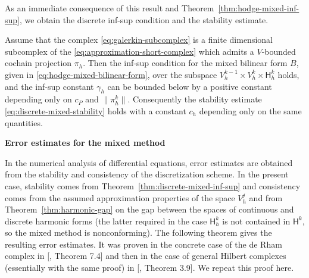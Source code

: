 {As an immediate consequence of this result and Theorem~\ref{thm:hodge-mixed-inf-sup}, we obtain the discrete inf-sup condition and the stability estimate.}

\begin{Theorem}\label{thm:discrete-mixed-inf-sup}
{Assume that the complex \eqref{eq:galerkin-subcomplex} is a finite dimensional subcomplex of the \eqref{eq:approximation-short-complex} which admits a $V$-bounded cochain projection $\pi_h$. Then the inf-sup condition for the mixed bilinear form $B$, given in \eqref{eq:hodge-mixed-bilinear-form}, over the subspace $V_h^{k-1}\times V_h^k\times\mathsf H_h^k$ holds, and the inf-sup constant $\gamma_h$ can be bounded below by a positive constant depending only on $c_P$ and $\|\pi_h^k\|$. Consequently the stability estimate \eqref{eq:discrete-mixed-stability} holds with a constant $c_h$ depending only on the same quantities.}
\end{Theorem}

\medskip\noindent\textbf{{Error estimates for the mixed method}}\par
{In the numerical analysis of differential equations, error estimates are obtained from the stability and consistency of the discretization scheme. In the present case, stability comes from Theorem~\ref{thm:discrete-mixed-inf-sup} and consistency comes from the assumed approximation properties of the space $V_h^j$ and from Theorem~\ref{thm:harmonic-gap} on the gap between the spaces of continuous and discrete harmonic forms (the latter required in the case $\mathsf H_h^k$ is not contained in $\mathsf H^k$, so the mixed method is nonconforming). The following theorem gives the resulting error estimates. It was proven in the concrete case of the de Rham complex in [, Theorem 7.4] and then in the case of general Hilbert complexes (essentially with the same proof) in [, Theorem 3.9]. We repeat this proof here.}

